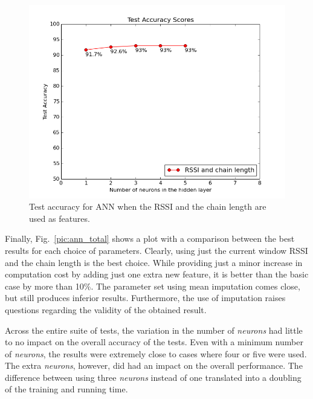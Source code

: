 \begin{figure}[h]
	\begin{center}
		\includegraphics[scale=0.5]{figures/ann_chain.png}
	\end{center}
	
	\caption{Test accuracy for ANN when the RSSI and the chain length are used as features.}
	\label{pic:ann_chain}

\end{figure}

Finally, Fig.~\ref{pic:ann_total} shows a plot with a comparison between the best results for each choice of parameters. Clearly, using just the current window RSSI and the chain length is the best choice. While providing just a minor increase in computation cost by adding just one extra new feature, it is better than the basic case by more than 10\%. The parameter set using mean imputation comes close, but still produces inferior results. Furthermore, the use of imputation raises questions regarding the validity of the obtained result. 

Across the entire suite of tests, the variation in the number of \textit{neurons} had little to no impact on the overall accuracy of the tests. Even with a minimum number of \textit{neurons}, the results were extremely close to cases where four or five were used. The extra \textit{neurons}, however, did had an impact on the overall performance. The difference between using three \textit{neurons} instead of one translated into a doubling of the training and running time. 

